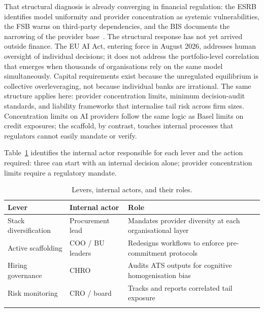 \documentclass[11pt,a4paper]{article}
\begin{document}
That structural diagnosis is already converging in financial regulation: the ESRB identifies
model uniformity and provider concentration as systemic vulnerabilities, the FSB
warns on third-party dependencies, and the BIS documents the narrowing of the
provider base~\cite{esrb_asc_2025, fsb_2025, bisfsi_2025, danielsson_jfs_2025}.
The structural response has not yet arrived outside finance.
The EU AI Act, entering force in August 2026, addresses human oversight of
individual decisions; it does not address the portfolio-level correlation that
emerges when thousands of organisations rely on the same model simultaneously.
Capital requirements exist because the unregulated equilibrium is collective
overleveraging, not because individual banks are irrational.
The same structure applies here: provider concentration limits, minimum
decision-audit standards, and liability frameworks that internalise tail risk
across firm sizes.
Concentration limits on AI providers follow the same logic as Basel limits on
credit exposures; the scaffold, by contrast, touches internal processes that
regulators cannot easily mandate or verify.

Table~\ref{tab:levers} identifies the internal actor responsible for each lever
and the action required: three can start with an internal decision alone;
provider concentration limits require a regulatory mandate.

\vspace{6pt}
\begin{table}[h!]
\centering
\footnotesize
\setlength{\tabcolsep}{9pt}
\renewcommand{\arraystretch}{1.35}
\begin{tabularx}{\linewidth}{@{}p{3.2cm}p{3cm}X@{}}
\toprule
\rowcolor{gray!14}
\textbf{Lever} & \textbf{Internal actor} & \textbf{Role} \\
\midrule
Stack diversification & Procurement lead & Mandates provider diversity at each organisational layer \\
\midrule
Active scaffolding & COO / BU leaders & Redesigns workflows to enforce pre-commitment protocols \\
\midrule
Hiring governance & CHRO & Audits ATS outputs for cognitive homogenisation bias \\
\midrule
Risk monitoring & CRO / board & Tracks and reports correlated tail exposure \\
\arrayrulecolor{black}
\bottomrule
\end{tabularx}
\caption{Levers, internal actors, and their roles.}
\label{tab:levers}
\end{table}
\smallskip
{}
\vspace{4pt}
\end{document}
